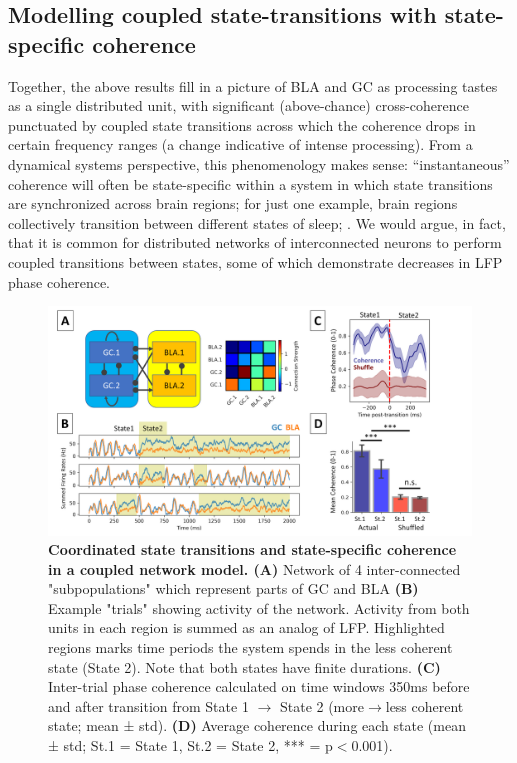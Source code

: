 \begin{refsection}
\subsection{Modelling coupled state-transitions with state-specific coherence}
Together, the above results fill in a picture of BLA and GC as processing tastes as a single distributed unit, with significant (above-chance) cross-coherence punctuated by coupled state transitions across which the coherence drops in certain frequency ranges (a change indicative of intense processing). From a dynamical systems perspective, this phenomenology makes sense: “instantaneous” coherence will often be state-specific within a system in which state transitions are synchronized across brain regions; for just one example, brain regions collectively transition between different states of sleep; \cite{stitt2017a}. We would argue, in fact, that it is common for distributed networks of interconnected neurons to perform coupled transitions between states, some of which demonstrate decreases in LFP phase coherence.

\begin{figure}
\includegraphics[width=\linewidth]{mahmood_22_figures/fig10-0.png}
\caption{\textbf{Coordinated state transitions and state-specific coherence in a coupled network model. (A)} Network of 4 inter-connected "subpopulations" which represent parts of GC and BLA \textbf{(B)} Example "trials" showing activity of the network. Activity from both units in each region is summed as an analog of LFP. Highlighted regions marks time periods the system spends in the less coherent state (State 2). Note that both states have finite durations. \textbf{(C)} Inter-trial phase coherence calculated on time windows 350ms before and after transition from State 1 $\rightarrow$ State 2 (more$\rightarrow$less coherent state; mean ± std). \textbf{(D)} Average coherence during each state (mean ± std; St.1 = State 1, St.2 = State 2, *** = p\(<\)0.001).}
\label{fig:wrapfig}
\end{figure}


\end{refsection}
